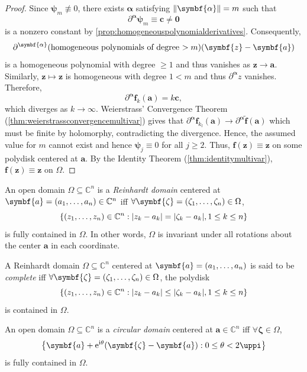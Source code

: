 \begin{proof}
    Since \(\symbf{\psi}_m\not\equiv 0\), there exists \(\symbf{\alpha}\) satisfying \(\norm{\symbf{\alpha}}=m\) such that \[\partial^{\symbf{\alpha}}\symbf{\psi}_m\equiv\symbf{c}\neq\symbf{0}\] is a nonzero constant by \cref{prop:homogeneouspolynomialderivatives}. Consequently, \[\partial^{\symbf{\alpha}}\qty(\text{homogeneous polynomials of degree \(>m\)})(\symbf{z}-\symbf{a})\] is a homogeneous polynomial with degree \(\geq 1\) and thus vanishes as \(\symbf{z}\to\symbf{a}\). Similarly, \(\symbf{z}\mapsto\symbf{z}\) is homogeneous with degree \(1<m\) and thus \(\partial^{\symbf{\alpha}}z\) vanishes. Therefore, \[\partial^{\symbf{\alpha}}\symbf{f}_k(\symbf{a})=k\symbf{c},\] which diverges as \(k\to\infty\). Weierstrass' Convergence Theorem (\cref{thm:weierstrassconvergencemultivar}) gives that \(\partial^{\symbf{\alpha}}\symbf{f}_{k_l}(\symbf{a})\to\partial^{\symbf{\alpha}}\widetilde{\symbf{f}}(\symbf{a})\) which must be finite by holomorphy, contradicting the divergence. Hence, the assumed value for \(m\) cannot exist and hence \(\symbf{\psi}_j\equiv 0\) for all \(j\geq 2\). Thus, \(\symbf{f}(\symbf{z})\equiv\symbf{z}\) on some polydisk centered at \(\symbf{a}\). By the Identity Theorem (\cref{thm:identitymultivar}), \(\symbf{f}(\symbf{z})\equiv\symbf{z}\) on \(\Omega\).
\end{proof}
\begin{definition}\label{def:reinhardtdomain}
    An open domain \(\Omega\subseteq\mathbb{C}^n\) is a \textit{Reinhardt domain} centered at \(\symbf{a}=\qty(a_1,\ldots,a_n)\in\mathbb{C}^n\) iff \(\forall\symbf{\zeta}=\qty(\zeta_1,\dots,\zeta_n)\in\Omega\), \[\cbraces{\qty(z_1,\ldots,z_n)\in\mathbb{C}^n}{\abs{z_k-a_k}=\abs{\zeta_k-a_k},1\leq k\leq n}\] is fully contained in \(\Omega\). In other words, \(\Omega\) is invariant under all rotations about the center \(\symbf{a}\) in each coordinate.
\end{definition}
\begin{definition}\label{def:completereinhardtdomain}
    A Reinhardt domain \(\Omega\subseteq\mathbb{C}^n\) centered at \(\symbf{a}=\qty(a_1,\ldots,a_n)\) is said to be \textit{complete} iff \(\forall\symbf{\zeta}=\qty(\zeta_1,\dots,\zeta_n)\in\Omega\), the polydisk \[\cbraces{\qty(z_1,\dots,z_n)\in\mathbb{C}^n}{\abs{z_k-a_k}\leq\abs{\zeta_k-a_k},1\leq k\leq n}\] is contained in \(\Omega\).
\end{definition}
\begin{definition}\label{def:circulardomain}
    An open domain \(\Omega\subseteq\mathbb{C}^n\) is a \textit{circular domain} centered at \(\symbf{a}\in\mathbb{C}^n\) iff \(\forall\symbf{\zeta}\in\Omega\), \[\cbraces{\symbf{a}+\ee^{\ii\theta}\qty(\symbf{\zeta}-\symbf{a})}{0\leq\theta<2\uppi}\] is fully contained in \(\Omega\).
\end{definition}

